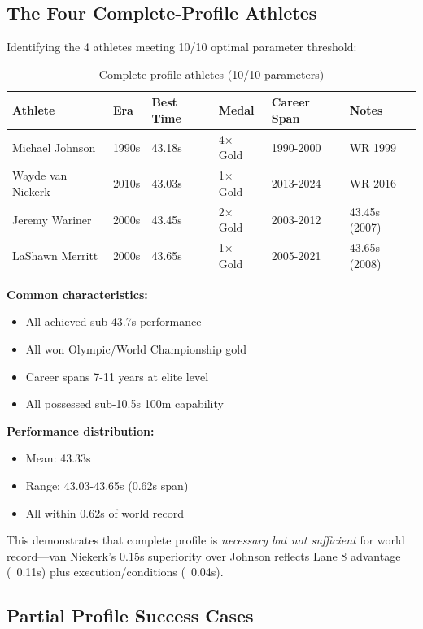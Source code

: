 \subsection{The Four Complete-Profile Athletes}

Identifying the 4 athletes meeting 10/10 optimal parameter threshold:

\begin{table}[H]
\centering
\caption{Complete-profile athletes (10/10 parameters)}
\small
\begin{tabular}{@{}llllll@{}}
\toprule
\textbf{Athlete} & \textbf{Era} & \textbf{Best Time} & \textbf{Medal} & \textbf{Career Span} & \textbf{Notes} \\
\midrule
Michael Johnson & 1990s & 43.18s & 4× Gold & 1990-2000 & WR 1999 \\
Wayde van Niekerk & 2010s & 43.03s & 1× Gold & 2013-2024 & WR 2016 \\
Jeremy Wariner & 2000s & 43.45s & 2× Gold & 2003-2012 & 43.45s (2007) \\
LaShawn Merritt & 2000s & 43.65s & 1× Gold & 2005-2021 & 43.65s (2008) \\
\bottomrule
\end{tabular}
\end{table}

\textbf{Common characteristics:}
\begin{itemize}
    \item All achieved sub-43.7s performance
    \item All won Olympic/World Championship gold
    \item Career spans 7-11 years at elite level
    \item All possessed sub-10.5s 100m capability
\end{itemize}

\textbf{Performance distribution:}
\begin{itemize}
    \item Mean: 43.33s
    \item Range: 43.03-43.65s (0.62s span)
    \item All within 0.62s of world record
\end{itemize}

This demonstrates that complete profile is \textit{necessary but not sufficient} for world record—van Niekerk's 0.15s superiority over Johnson reflects Lane 8 advantage (~0.11s) plus execution/conditions (~0.04s).

\subsection{Partial Profile Success Cases}

